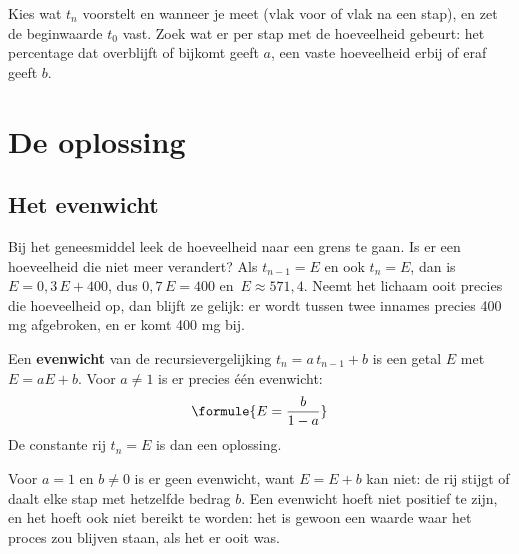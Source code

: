 \begin{werkwijze}
Kies wat $t_n$ voorstelt en wanneer je meet (vlak voor of vlak na een stap), en zet de beginwaarde $t_0$ vast. Zoek wat er per stap met de hoeveelheid gebeurt: het percentage dat overblijft of bijkomt geeft $a$, een vaste hoeveelheid erbij of eraf geeft $b$.
\end{werkwijze}


\begin{oefeningen}
\end{oefeningen}

\section{De oplossing}

\subsection{Het evenwicht}

Bij het geneesmiddel leek de hoeveelheid naar een grens te gaan. Is er een hoeveelheid die niet meer verandert? Als $t_{n-1} = E$ en ook $t_n = E$, dan is $E = 0{,}3\,E + 400$, dus $0{,}7\,E = 400$ en~$E \approx 571{,}4$. Neemt het lichaam ooit precies die hoeveelheid op, dan blijft ze gelijk: er wordt tussen twee innames precies 400 mg afgebroken, en er komt 400 mg bij.

\begin{theorie}
Een \textbf{\textcolor{accent}{evenwicht}} van de recursievergelijking $t_n = a\, t_{n-1} + b$ is een getal $E$ met $E = aE + b$. Voor $a \neq 1$ is er precies één evenwicht:
\[
\formule{E = \frac{b}{1 - a}}
\]
De constante rij $t_n = E$ is dan een oplossing.
\end{theorie}

Voor $a = 1$ en $b \neq 0$ is er geen evenwicht, want $E = E + b$ kan niet: de rij stijgt of daalt elke stap met hetzelfde bedrag $b$. Een evenwicht hoeft niet positief te zijn, en het hoeft ook niet bereikt te worden: het is gewoon een waarde waar het proces zou blijven staan, als het er ooit was.


